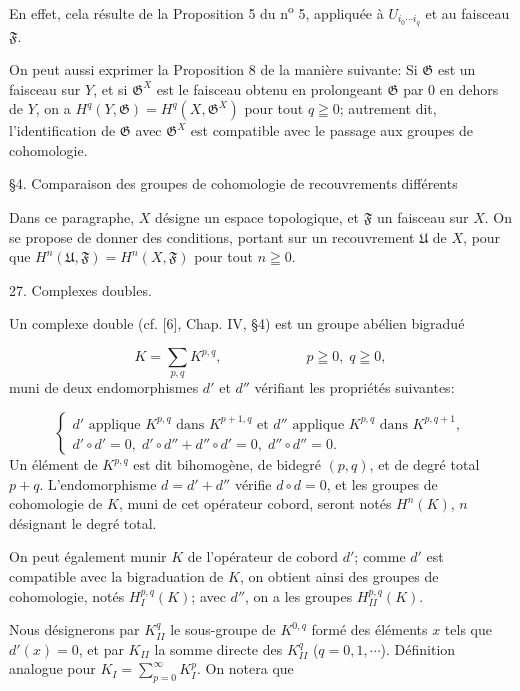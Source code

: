 En effet, cela résulte de la Proposition 5 du n\textsuperscript{o} 5, appliquée à $U_{i_0 \cdots i_q}$ et au faisceau $\mathfrak{F}$.

On peut aussi exprimer la Proposition 8 de la manière suivante: Si $\mathfrak{G}$ est un faisceau sur $Y$, et si $\mathfrak{G}^X$ est le faisceau obtenu en prolongeant $\mathfrak{G}$ par 0 en dehors de $Y$, on a $H^q(Y, \mathfrak{G}) = H^q(X, \mathfrak{G}^X)$ pour tout $q \geqq 0$; autrement dit, l'identification de $\mathfrak{G}$ avec $\mathfrak{G}^X$ est compatible avec le passage aux groupes de cohomologie.


\S4. Comparaison des groupes de cohomologie de recouvrements différents

Dans ce paragraphe, $X$ désigne un espace topologique, et $\mathfrak{F}$ un faisceau sur $X$. On se propose de donner des conditions, portant sur un recouvrement $\mathfrak{U}$ de $X$, pour que $H^n(\mathfrak{U}, \mathfrak{F}) = H^n(X, \mathfrak{F})$ pour tout $n \geqq 0$.


27. Complexes doubles.

Un complexe double (cf. [6], Chap. IV, \S4) est un groupe abélien bigradué

\begin{equation*}
K = \sum_{p,q} K^{p,q}, \qquad\qquad\qquad p \geqq 0,\; q \geqq 0,
\end{equation*}
muni de deux endomorphismes $d'$ et $d''$ vérifiant les propriétés suivantes:

\begin{equation*}
\begin{cases} d' \text{ applique } K^{p,q} \text{ dans } K^{p+1,q} \text{ et } d'' \text{ applique } K^{p,q} \text{ dans } K^{p,q+1}, \\ d' \circ d' = 0,\; d' \circ d'' + d'' \circ d' = 0,\; d'' \circ d'' = 0. \end{cases}
\end{equation*}
Un élément de $K^{p,q}$ est dit bihomogène, de bidegré $(p, q)$, et de degré total $p + q$. L'endomorphisme $d = d' + d''$ vérifie $d \circ d = 0$, et les groupes de cohomologie de $K$, muni de cet opérateur cobord, seront notés $H^n(K)$, $n$ désignant le degré total.

On peut également munir $K$ de l'opérateur de cobord $d'$; comme $d'$ est compatible avec la bigraduation de $K$, on obtient ainsi des groupes de cohomologie, notés $H_I^{p,q}(K)$; avec $d''$, on a les groupes $H_{II}^{p,q}(K)$.

Nous désignerons par $K_{II}^q$ le sous-groupe de $K^{0,q}$ formé des éléments $x$ tels que $d'(x) = 0$, et par $K_{II}$ la somme directe des $K_{II}^q$ ($q = 0, 1, \cdots$). Définition analogue pour $K_I = \sum_{p=0}^{\infty} K_I^p$. On notera que

